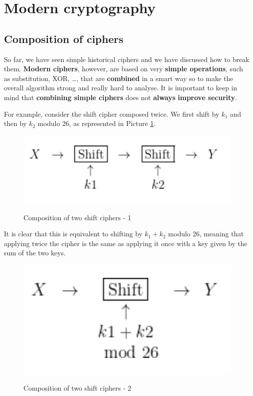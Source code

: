 \section{Modern cryptography}

\subsection{Composition of ciphers}
So far, we have seen simple historical ciphers and we have discussed how to break them. \textbf{Modern ciphers}, however, are based on very \textbf{simple operations}, such as substitution, XOR, …, that are \textbf{combined} in a smart way so to make the overall algorithm strong and really hard to analyse. It is important to keep in mind that \textbf{combining simple ciphers} does not \textbf{always} \textbf{improve security}. 

For example, consider the shift cipher composed twice. We first shift by $k_1$ and then by $k_2$ modulo 26, as represented in Picture \ref{comp1}.

\begin{figure}[h!]
        \centering
        \includegraphics[scale = 1.0]{img/comp1.png}
        \label{comp1}
        \caption{Composition of two shift ciphers - 1}
\end{figure}

It is clear that this is equivalent to shifting by $k_1+k_2$ modulo 26, meaning that applying twice the cipher is the same as applying it once with a key given by the sum of the two keys.

\begin{figure}[h!]
        \centering
        \includegraphics[scale = 1.0]{img/comp2.png}
        \label{comp2}
        \caption{Composition of two shift ciphers - 2}
\end{figure}


